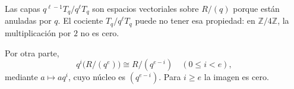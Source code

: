 \begin{obs}
Las capas $q^{\ell-1}T_q/q^\ell T_q$ son espacios vectoriales sobre $R/(q)$ porque están anuladas por $q$. El cociente $T_q/q^\ell T_q$ puede no tener esa propiedad: en $\mathbb Z/4\mathbb Z$, la multiplicación por $2$ no es cero.

Por otra parte,
\[
q^i\bigl(R/(q^e)\bigr)\cong R/(q^{e-i})\quad(0\leq i<e),
\]
mediante $a\mapsto aq^i$, cuyo núcleo es $(q^{e-i})$. Para $i\geq e$ la imagen es cero.
\end{obs}

